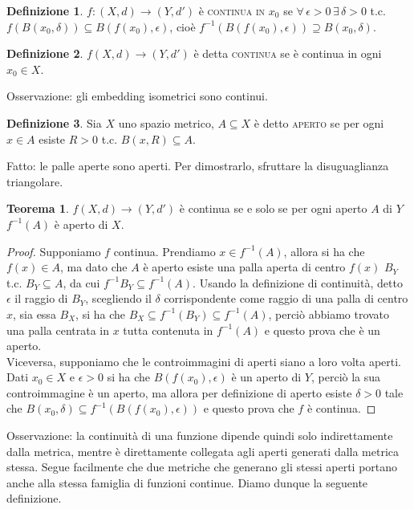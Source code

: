 \documentclass{article}
\theoremstyle{definition}
\newtheorem*{thm}{Teorema}
\newtheorem*{defn}{Definizione}
\begin{document}
	\begin{defn}
		$f:(X, d) \rightarrow (Y, d')$ è \textsc{continua in $x_0$} se $\forall \, \epsilon > 0 \, \exists \, \delta >0$ t.c. $f(B(x_0, \delta)) \subseteq B(f(x_0), \epsilon)$, cioè $f^{-1}(B(f(x_0), \epsilon)) \supseteq B(x_0, \delta)$.
	\end{defn}
	
	\begin{defn}
		$f(X, d) \rightarrow (Y, d')$ è detta \textsc{continua} se è continua in ogni $x_0 \in X$.
	\end{defn}
	
	Osservazione: gli embedding isometrici sono continui.
	
	\begin{defn}
		Sia $X$ uno spazio metrico, $A \subseteq X$ è detto \textsc{aperto} se per ogni $x \in A$ esiste $R>0$ t.c. $B(x, R) \subseteq A$.
	\end{defn}
	
	Fatto: le palle aperte sono aperti. Per dimostrarlo, sfruttare la disuguaglianza triangolare.
	
	\begin{thm}
		$f(X, d) \rightarrow (Y, d')$ è continua se e solo se per ogni aperto $A$ di $Y$ $f^{-1}(A)$ è aperto di $X$.
	\end{thm}
	
	\begin{proof}
		Supponiamo $f$ continua. Prendiamo $x \in f^{-1}(A)$, allora si ha che $f(x) \in A$, ma dato che $A$ è aperto esiste una palla aperta di centro $f(x)$ $B_Y$ t.c. $B_Y \subseteq A$, da cui $f^{-1}{B_Y} \subseteq f^{-1}(A)$. Usando la definizione di continuità, detto $\epsilon$ il raggio di $B_Y$, scegliendo il $\delta$ corrispondente come raggio di una palla di centro $x$, sia essa $B_X$, si ha che $B_X \subseteq f^{-1}(B_Y) \subseteq f^{-1}(A)$, perciò abbiamo trovato una palla centrata in $x$ tutta contenuta in $f^{-1}(A)$ e questo prova che è un aperto. \\
		Viceversa, supponiamo che le controimmagini di aperti siano a loro volta aperti. Dati $x_0 \in X$ e $\epsilon >0$ si ha che $B(f(x_0), \epsilon)$ è un aperto di $Y$, perciò la sua controimmagine è un aperto, ma allora per definizione di aperto esiste $\delta>0$ tale che $B(x_0, \delta) \subseteq f^{-1}(B(f(x_0), \epsilon))$ e questo prova che $f$ è continua.
	\end{proof}
	
	Osservazione: la continuità di una funzione dipende quindi solo indirettamente dalla metrica, mentre è direttamente collegata agli aperti generati dalla metrica stessa. Segue facilmente che due metriche che generano gli stessi aperti portano anche alla stessa famiglia di funzioni continue. Diamo dunque la seguente definizione.
	
\end{document}
